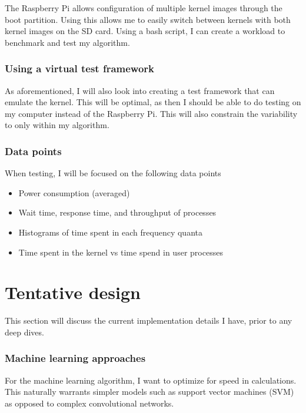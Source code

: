 \documentclass[12pt]{article}
\def\ind{\hspace*{0.3in}}
\begin{document}
\ind The Raspberry Pi allows configuration of multiple kernel images through the boot partition. Using this allows me to easily switch between kernels with both kernel images on the SD card. Using a bash script, I can create a workload to benchmark and test my algorithm.

\subsubsection*{Using a virtual test framework}

\ind As aforementioned, I will also look into creating a test framework that can emulate the kernel. This will be optimal, as then I should be able to do testing on my computer instead of the Raspberry Pi. This will also constrain the variability to only within my algorithm.

\subsubsection*{Data points}

When testing, I will be focused on the following data points
\begin{itemize}
    \item Power consumption (averaged)
    \item Wait time, response time, and throughput of processes
    \item Histograms of time spent in each frequency quanta
    \item Time spent in the kernel vs time spend in user processes
\end{itemize}

\section*{Tentative design}

This section will discuss the current implementation details I have, prior to any deep dives.

\subsubsection*{Machine learning approaches}
\ind For the machine learning algorithm, I want to optimize for speed in calculations. This naturally warrants simpler models such as support vector machines (SVM) as opposed to complex convolutional networks. 
\end{document}
